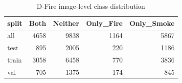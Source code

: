 \begin{table}
\caption{D-Fire image-level class distribution}
\begin{tabular}{lrrrr}
\toprule
split & Both & Neither & Only\_Fire & Only\_Smoke \\
\midrule
all & 4658 & 9838 & 1164 & 5867 \\
test & 895 & 2005 & 220 & 1186 \\
train & 3058 & 6458 & 770 & 3836 \\
val & 705 & 1375 & 174 & 845 \\
\bottomrule
\end{tabular}
\end{table}
